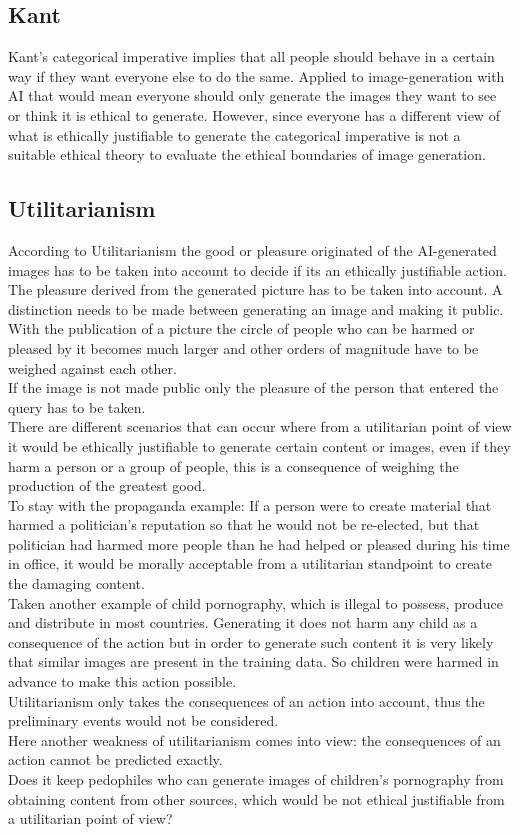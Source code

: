 \documentclass[11pt]{article}
\begin{document}
\subsection{Kant}
Kant's categorical imperative implies that all people should behave in a certain way if they want everyone else to do the same.
Applied to image-generation with AI that would mean everyone should only generate the images they want to see or think it is ethical to generate.
However, since everyone has a different view of what is ethically justifiable to generate the categorical imperative is not a suitable ethical theory to evaluate the ethical boundaries of image generation.
\subsection{Utilitarianism}
According to Utilitarianism the good or pleasure originated of the AI-generated images has to be taken into account to decide if its an ethically justifiable action. \\
The pleasure derived from the generated picture has to be taken into account.
A distinction needs to be made between generating an image and making it public. With the publication of a picture the circle of people who can be harmed or pleased by it becomes much larger and other orders of magnitude have to be weighed against each other.\\
If the image is not made public only the pleasure of the person that entered the query has to be taken. \\
There are different scenarios that can occur where from a utilitarian point of view it would be ethically justifiable to generate certain content or images, even if they harm a person or a group of people, this is a consequence of weighing the production of the greatest good. \\
To stay with the propaganda example: If a person were to create material that harmed a politician's reputation so that he would not be re-elected, but that politician had harmed more people than he had helped or pleased during his time in office, it would be morally acceptable from a utilitarian standpoint to create the damaging content.\\
Taken another example of child pornography, which is illegal to possess, produce and distribute in most countries. Generating it does not harm any child as a consequence of the action but in order to generate such content it is very likely that similar images are present in the training data. So children were harmed in advance to make this action possible.\\ Utilitarianism only takes the consequences of an action into account, thus the preliminary events would not be considered. \\
Here another weakness of utilitarianism comes into view: the consequences of an action cannot be predicted exactly.\\
Does it keep pedophiles who can generate images of children's pornography from obtaining content from other sources, which would be not ethical justifiable from a utilitarian point of view?
\end{document}
